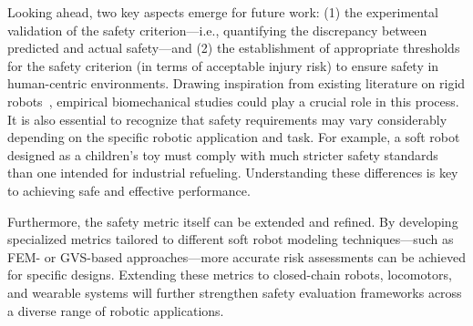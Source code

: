 Looking ahead, two key aspects emerge for future work: (1) the experimental validation of the safety criterion—i.e., quantifying the discrepancy between predicted and actual safety—and (2) the establishment of appropriate thresholds~\citep{iso2016collaborative, behrens2022statistical} for the safety criterion (in terms of acceptable injury risk) to ensure safety in human-centric environments. Drawing inspiration from existing literature on rigid robots~\citep{yamada1997evaluation, muttray2014collaborative, behrens2022statistical}, empirical biomechanical studies could play a crucial role in this process. It is also essential to recognize that safety requirements may vary considerably depending on the specific robotic application and task. For example, a soft robot designed as a children’s toy must comply with much stricter safety standards than one intended for industrial refueling. Understanding these differences is key to achieving safe and effective performance.

Furthermore, the safety metric itself can be extended and refined. By developing specialized metrics tailored to different soft robot modeling techniques—such as \gls{FEM}- or \gls{GVS}-based approaches—more accurate risk assessments can be achieved for specific designs. Extending these metrics to closed-chain robots, locomotors, and wearable systems will further strengthen safety evaluation frameworks across a diverse range of robotic applications.

